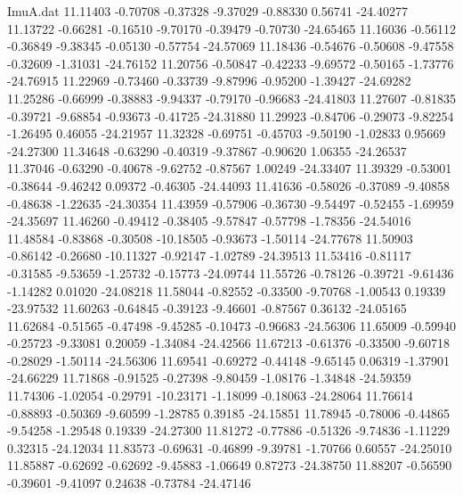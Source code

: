 \begin{filecontents}{ImuA.dat}
  11.11403   -0.70708   -0.37328   -9.37029   -0.88330    0.56741  -24.40277
  11.13722   -0.66281   -0.16510   -9.70170   -0.39479   -0.70730  -24.65465
  11.16036   -0.56112   -0.36849   -9.38345   -0.05130   -0.57754  -24.57069
  11.18436   -0.54676   -0.50608   -9.47558   -0.32609   -1.31031  -24.76152
  11.20756   -0.50847   -0.42233   -9.69572   -0.50165   -1.73776  -24.76915
  11.22969   -0.73460   -0.33739   -9.87996   -0.95200   -1.39427  -24.69282
  11.25286   -0.66999   -0.38883   -9.94337   -0.79170   -0.96683  -24.41803
  11.27607   -0.81835   -0.39721   -9.68854   -0.93673   -0.41725  -24.31880
  11.29923   -0.84706   -0.29073   -9.82254   -1.26495    0.46055  -24.21957
  11.32328   -0.69751   -0.45703   -9.50190   -1.02833    0.95669  -24.27300
  11.34648   -0.63290   -0.40319   -9.37867   -0.90620    1.06355  -24.26537
  11.37046   -0.63290   -0.40678   -9.62752   -0.87567    1.00249  -24.33407
  11.39329   -0.53001   -0.38644   -9.46242    0.09372   -0.46305  -24.44093
  11.41636   -0.58026   -0.37089   -9.40858   -0.48638   -1.22635  -24.30354
  11.43959   -0.57906   -0.36730   -9.54497   -0.52455   -1.69959  -24.35697
  11.46260   -0.49412   -0.38405   -9.57847   -0.57798   -1.78356  -24.54016
  11.48584   -0.83868   -0.30508  -10.18505   -0.93673   -1.50114  -24.77678
  11.50903   -0.86142   -0.26680  -10.11327   -0.92147   -1.02789  -24.39513
  11.53416   -0.81117   -0.31585   -9.53659   -1.25732   -0.15773  -24.09744
  11.55726   -0.78126   -0.39721   -9.61436   -1.14282    0.01020  -24.08218
  11.58044   -0.82552   -0.33500   -9.70768   -1.00543    0.19339  -23.97532
  11.60263   -0.64845   -0.39123   -9.46601   -0.87567    0.36132  -24.05165
  11.62684   -0.51565   -0.47498   -9.45285   -0.10473   -0.96683  -24.56306
  11.65009   -0.59940   -0.25723   -9.33081    0.20059   -1.34084  -24.42566
  11.67213   -0.61376   -0.33500   -9.60718   -0.28029   -1.50114  -24.56306
  11.69541   -0.69272   -0.44148   -9.65145    0.06319   -1.37901  -24.66229
  11.71868   -0.91525   -0.27398   -9.80459   -1.08176   -1.34848  -24.59359
  11.74306   -1.02054   -0.29791  -10.23171   -1.18099   -0.18063  -24.28064
  11.76614   -0.88893   -0.50369   -9.60599   -1.28785    0.39185  -24.15851
  11.78945   -0.78006   -0.44865   -9.54258   -1.29548    0.19339  -24.27300
  11.81272   -0.77886   -0.51326   -9.74836   -1.11229    0.32315  -24.12034
  11.83573   -0.69631   -0.46899   -9.39781   -1.70766    0.60557  -24.25010
  11.85887   -0.62692   -0.62692   -9.45883   -1.06649    0.87273  -24.38750
  11.88207   -0.56590   -0.39601   -9.41097    0.24638   -0.73784  -24.47146

\end{filecontents}
